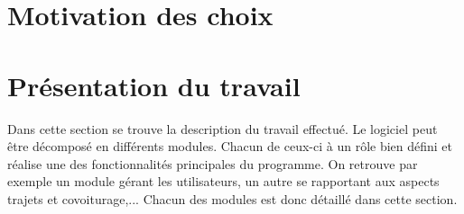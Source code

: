 \documentclass[12pt, a4paper, oneside]{article}
\begin{document}
\section{Motivation des choix}
\section{Présentation du travail}
    Dans cette section se trouve la description du travail effectué. Le logiciel peut être décomposé en différents modules. Chacun de ceux-ci à un rôle bien défini et réalise une des fonctionnalités principales du programme.  On retrouve par exemple un module gérant les utilisateurs, un autre se rapportant aux aspects trajets et covoiturage,... Chacun des modules est donc détaillé dans cette section.
\end{document}
